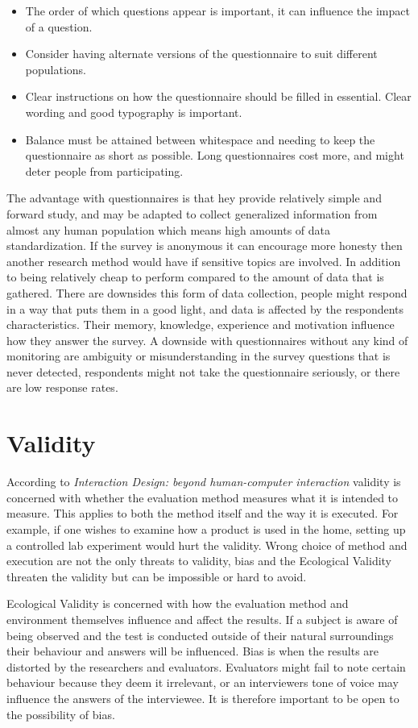 \begin{itemize}
  \item The order of which questions appear is important, it can influence the impact of a question.
  \item Consider having alternate versions of the questionnaire to suit different populations.
  \item Clear instructions on how the questionnaire should be filled in essential. Clear wording and good typography is important.
  \item Balance must be attained between whitespace and needing to keep the questionnaire as short as possible. Long questionnaires cost more, and might deter people from participating.
\end{itemize}

The advantage with questionnaires is that hey provide relatively simple and forward study, and may be adapted to collect generalized information from almost any human population which means high amounts of data standardization. If the survey is anonymous it can encourage more honesty then another research method would have if sensitive topics are involved. In addition to being relatively cheap to perform compared to the amount of data that is gathered. There are downsides this form of data collection, people might respond in a way that puts them in a good light, and data is affected by the respondents characteristics. Their memory, knowledge, experience and motivation influence how they answer the survey. A downside with questionnaires without any kind of monitoring are ambiguity or misunderstanding in the survey questions that is never detected, respondents might not take the questionnaire seriously, or there are low response rates.

\section{Validity}
According to \textit{Interaction Design: beyond human-computer interaction} validity is concerned with whether the evaluation method measures what it is intended to measure. This applies to both the method itself and the way it is executed. For example, if one wishes to examine how a product is used in the home, setting up a controlled lab experiment would hurt the validity. Wrong choice of method and execution are not the only threats to validity, bias and the Ecological Validity threaten the validity but can be impossible or hard to avoid.

Ecological Validity is concerned with how the evaluation method and environment themselves influence and affect the results. If a subject is aware of being observed and the test is conducted outside of their natural surroundings their behaviour and answers will be influenced. Bias is when the results are distorted by the researchers and evaluators. Evaluators might fail to note certain behaviour because they deem it irrelevant, or an interviewers tone of voice may influence the answers of the interviewee. It is therefore important to be open to the possibility of bias.

